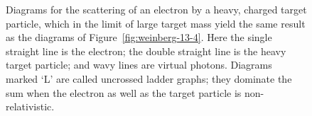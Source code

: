 \begin{figure}[tbp]
\caption{Diagrams for the scattering of an electron by a heavy, charged target particle, which in the limit of large target mass yield the same result as the diagrams of Figure~\ref{fig:weinberg-13-4}. Here the single straight line is the electron; the double straight line is the heavy target particle; and wavy lines are virtual photons. Diagrams marked `L' are called uncrossed ladder graphs; they dominate the sum when the electron as well as the target particle is non-relativistic.}
\label{fig:weinberg-13-5}
\end{figure}
\endgroup

